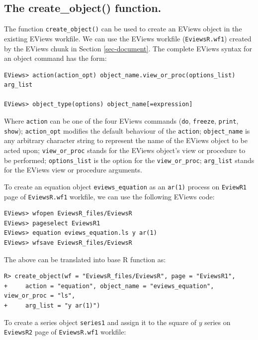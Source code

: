 \hypertarget{the-create_object-function.}{%
\subsection{The create\_object() function.}\label{the-create_object-function.}}

The function \texttt{create\_object()} can be used to create an EViews object in the existing EViews workfile. We can use the EViews workfile (\texttt{EviewsR.wf1}) created by the EViews chunk in Section \ref{sec-document}. The complete EViews syntax for an object command has the form:

\begin{verbatim}
EViews> action(action_opt) object_name.view_or_proc(options_list) arg_list

EViews> object_type(options) object_name[=expression]
\end{verbatim}

Where \texttt{action} can be one of the four EViews commands (\texttt{do}, \texttt{freeze}, \texttt{print}, \texttt{show}); \texttt{action\_opt} modifies the default behaviour of the \texttt{action}; \texttt{object\_name} is any arbitrary character string to represent the name of the EViews object to be acted upon; \texttt{view\_or\_proc} stands for the EViews object's view or procedure to be performed; \texttt{options\_list} is the option for the \texttt{view\_or\_proc}; \texttt{arg\_list} stands for the EViews view or procedure arguments.

To create an equation object \texttt{eviews\_equation} as an \texttt{ar(1)} process on \texttt{EviewR1} page of \texttt{EviewsR.wf1} workfile, we can use the following EViews code:

\begin{verbatim}
EViews> wfopen EviewsR_files/EviewsR
EViews> pageselect EviewsR1
EViews> equation eviews_equation.ls y ar(1)
EViews> wfsave EviewsR_files/EviewsR
\end{verbatim}

The above can be translated into base R function as:

\begin{verbatim}
R> create_object(wf = "EviewsR_files/EviewsR", page = "EviewsR1",
+     action = "equation", object_name = "eviews_equation", view_or_proc = "ls",
+     arg_list = "y ar(1)")
\end{verbatim}

To create a series object \texttt{series1} and assign it to the square of \(y\) series on \texttt{EviewsR2} page of \texttt{EviewsR.wf1} workfile:

